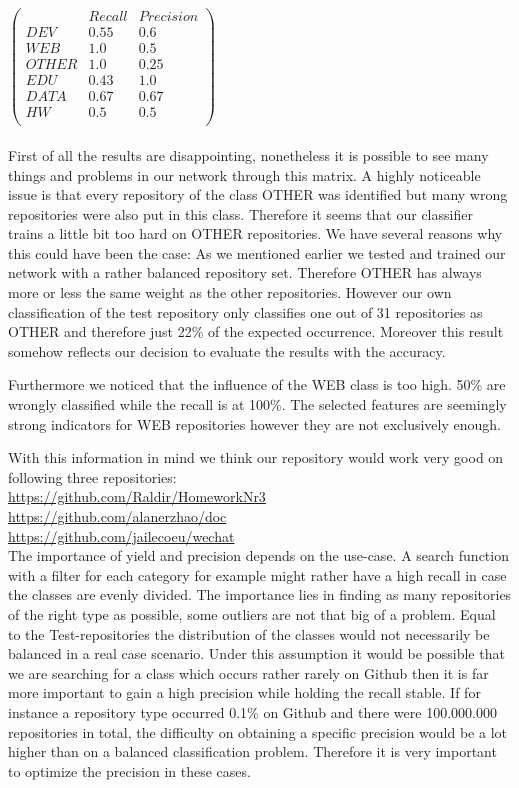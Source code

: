 \documentclass[paper=A4,pagesize=auto,12pt,headinclude=true,footinclude=true,BCOR=0mm,DIV=calc]{scrartcl}
\begin{document}
		$\begin{pmatrix}
		    & Recall & Precision \\
		   \hline
		DEV & 0.55 & 0.6\\
		 WEB& 1.0 & 0.5 \\
		 OTHER& 1.0 & 0.25 \\
		 ED U& 0.43 & 1.0 \\
		  DATA & 0.67 & 0.67 \\
		  HW& 0.5 & 0.5 \\
		\end{pmatrix}$
	\\
	\\
	First of all the results are disappointing, nonetheless it is possible to see many things and problems in our network through this matrix. A highly noticeable issue is that every repository of the class OTHER was identified but many wrong repositories were also put in this class. Therefore it seems that our classifier trains a little bit too hard on OTHER repositories. We have several reasons why this could have been the case: As we mentioned earlier we tested and trained our network with a rather balanced repository set. Therefore OTHER has always more or less the same weight as the other repositories. However our own classification of the test repository only classifies one out of 31 repositories as OTHER and therefore just 22\% of the expected occurrence. Moreover this result somehow reflects our decision to evaluate the results with the accuracy.\cite{EvaluateNetwork}
	
	Furthermore we noticed that the influence of the WEB class is too high. 50\% are wrongly classified while the recall is at 100\%. The selected features are seemingly strong indicators for WEB repositories however they are not exclusively enough.
	
	
	With this information in mind we think our repository would work very good on following three repositories:\\
	\url{https://github.com/Raldir/HomeworkNr3}\\
	\url{https://github.com/alanerzhao/doc}\\
	\url{https://github.com/jailecoeu/wechat}\\
	
	
	 The importance of yield and precision depends on the use-case. A search function with a filter for each category for example might rather have a high recall in case the classes are evenly divided. The importance lies in finding as many repositories of the right type as possible, some outliers are not that big of a problem. Equal to the Test-repositories the distribution of the classes would not necessarily be balanced in a real case scenario. Under this assumption it would be possible that we are searching for a class which occurs rather rarely on Github then it is far more important to gain a high precision while holding the recall stable. If for instance a repository type occurred 0.1\% on Github and there were 100.000.000 repositories in total, the difficulty on obtaining a specific precision would be a lot higher than on a balanced classification problem. Therefore it is very important to optimize the precision in these cases.
	
\end{document}
